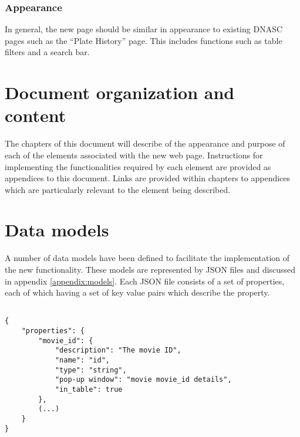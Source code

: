 \subsubsection{Appearance}
In general, the new page should be similar in appearance to existing DNASC pages such as 
the ``Plate History'' page. This includes functions such as table filters and a search bar. 

\section{Document organization and content}

The chapters of this document will describe of the appearance and purpose of each of the
elements associated with the new web page. Instructions for implementing the 
functionalities required by each element are provided as appendices to this document. Links
are provided within chapters to appendices which are particularly relevant to the element 
being described.

\section{Data models}

A number of data models have been defined to facilitate the implementation of the new
functionality. These models are represented by JSON files and discussed in appendix 
\ref{appendix:models}. Each JSON file consists of a set of properties, each of which 
having a set of key value pairs which describe the property.

\begin{verbatim}
    
{ 
    "properties": {
        "movie_id": { 
            "description": "The movie ID",
            "name": "id",
            "type": "string",
            "pop-up window": "movie movie_id details",
            "in_table": true
        },
        (...)
    }
}

\end{verbatim}